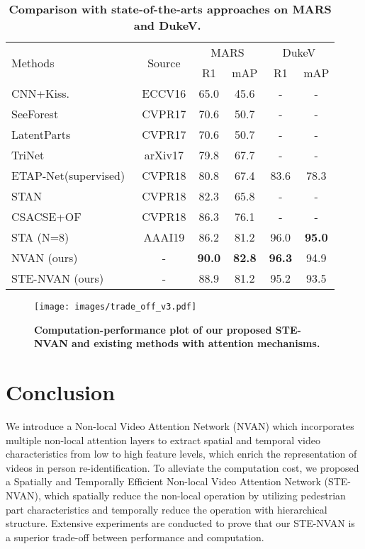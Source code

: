 \documentclass{bmvc2k}
\newcommand{\mycaption}[2]{\caption{\textbf{#1.}~#2}}
\begin{document}
\begin{table}[t]
    \centering
    \mycaption{Comparison with state-of-the-arts approaches on MARS and DukeV}{}
    \label{tab:sota}
   \begin{tabular}{l|c|cc|cc}
        \hline
       \multirow{2}{*}{Methods} & \multirow{2}{*}{Source} & \multicolumn{2}{c|}{MARS} & \multicolumn{2}{c}{DukeV}\\
       \cline{3-6}
        & &R1  & mAP   &R1  & mAP   \\ 
        \hline \hline
        CNN+Kiss.~\cite{mars}    & ECCV16       & 65.0     & 45.6    & - & -  \\
        SeeForest~\cite{forest}  & CVPR17       & 70.6     & 50.7    & - & - \\
        LatentParts~\cite{latent_part} & CVPR17 & 70.6     & 50.7    & - & -  \\
        TriNet~\cite{trip} & arXiv17            & 79.8     & 67.7    & - & -  \\
        ETAP-Net(supervised)~\cite{etap}&CVPR18 & 80.8     & 67.4    & 83.6 & 78.3 \\
        STAN~\cite{diversity} & CVPR18          & 82.3     & 65.8    & -    &  -\\
        CSACSE+OF~\cite{snip}  &  CVPR18        & 86.3     & 76.1    & -    &  -\\
        STA (N=8)~\cite{sta}  & AAAI19                & 86.2     & 81.2    & 96.0 &  \textbf{95.0} \\
        \hline
        NVAN (ours)    & -      & \textbf{90.0} & \textbf{82.8}& \textbf{96.3} & 94.9 \\
        STE-NVAN (ours)   & -       & 88.9      &   81.2    & 95.2  & 93.5\\
        \hline
     \end{tabular}
\vspace{-3mm}
\end{table}

\begin{figure*}[t]
	\centering
    \texttt{[image: images/trade\_off\_v3.pdf]}
    \mycaption{Computation-performance plot of our proposed STE-NVAN and existing methods with attention mechanisms}{}
    \label{fig:trade}
    \vspace{-3mm}
\end{figure*} \vspace{-5mm}
\section{Conclusion}
\vspace{-3mm}
We introduce a Non-local Video Attention Network (NVAN) which incorporates multiple non-local attention layers to extract spatial and temporal video characteristics from low to high feature levels, which enrich the representation of videos in person re-identification. To alleviate the computation cost, we proposed a Spatially and Temporally Efficient Non-local Video Attention Network (STE-NVAN), which spatially reduce the non-local operation by utilizing pedestrian part characteristics and temporally reduce the operation with hierarchical structure. Extensive experiments are conducted to prove that our STE-NVAN is a superior trade-off between performance and computation.
\end{document}
